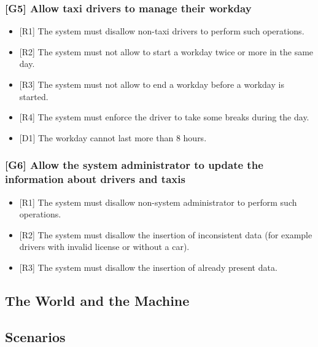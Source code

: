 \documentclass[a4paper,12pt,dvipsnames]{article}%
\begin{document}
\subsubsection{{[}G5{]} Allow taxi drivers to manage their workday}
\begin{itemize}
\item {[}R1{]} The system must disallow non-taxi drivers to perform such operations.
\item {[}R2{]} The system must not allow to start a workday twice or more in the same day.
\item {[}R3{]} The system must not allow to end a workday before a workday is started.
\item {[}R4{]} The system must enforce the driver to take some breaks during the day.
\item {[}D1{]} The workday cannot last more than 8 hours.
\end{itemize}
\label{goal5}
\subsubsection{{[}G6{]} Allow the system administrator to update the information about drivers and taxis}
\begin{itemize}
\item {[}R1{]} The system must disallow non-system administrator to perform such operations.
\item {[}R2{]} The system must disallow the insertion of inconsistent data (for example drivers with invalid license or without a car).
\item {[}R3{]} The system must disallow the insertion of already present data.
\end{itemize} 
\label{goal6}
\subsection{The World and the Machine}
\subsection{Scenarios}
\end{document}
